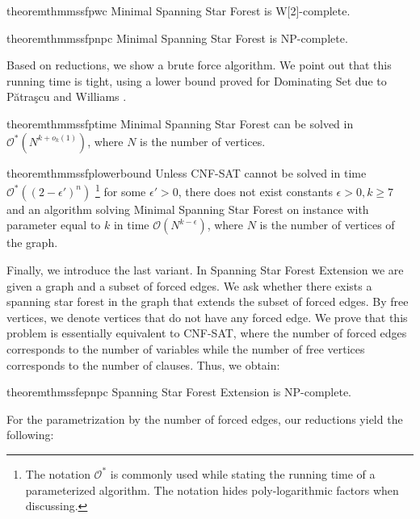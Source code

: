 \documentclass[en]{pracamgr}
\theoremstyle{definition}
\newcommand{\mssfp}{{\sc Minimal Spanning Star Forest}}
\newcommand{\ssfep}{{\sc Spanning Star Forest Extension}}
\newcommand{\domsetp}{{\sc Dominating Set}}
\newcommand{\cnfsat}{{\sc CNF-SAT}}
\begin{document}
\begin{restatable}{theorem}{thmmssfpwc}\label{thm-mssfp-w2c}
	\mssfp{} is \textup{W[2]}-complete.
\end{restatable}

\begin{restatable}{theorem}{thmmssfpnpc}\label{thm-mssfp-npc}
	\mssfp{} is \textup{NP-complete}.
\end{restatable}

\noindent
Based on reductions, we show a brute force algorithm. We point out that this running time is tight, using a lower bound proved for \domsetp{} due to Pătraşcu and Williams \cite{DomSet}. 

\begin{restatable}{theorem}{thmmssfptime}\label{thm-mssfp-time}
	\mssfp{} can be solved in $\mathcal{O}^*(N^{k + o_k(1)})$, where $N$ is the number of vertices.
\end{restatable}

\begin{restatable}{theorem}{thmmssfplowerbound}\label{thm-mssfp-lowerbound}
	Unless \cnfsat{} cannot be solved in time $\mathcal{O}^*((2-\epsilon')^n)$
	\footnote{The notation $\mathcal{O}^*$ is commonly used while stating the running time of a parameterized algorithm. The notation hides poly-logarithmic factors when discussing.}
	 for some $\epsilon' > 0$, there does not exist constants $\epsilon > 0,k\geq 7$ and an algorithm solving \mssfp{} on instance with parameter equal to $k$ in time $\mathcal{O}(N^{k-\epsilon})$, where $N$ is the number of vertices of the graph.
\end{restatable}

Finally, we introduce the last variant. In \ssfep{} we are given a graph and a subset of forced edges. We ask whether there exists a spanning star forest in the graph that extends the subset of forced edges. By free vertices, we denote vertices that do not have any forced edge. We prove that this problem is essentially equivalent to \cnfsat{}, where the number of forced edges corresponds to the number of variables while the number of free vertices corresponds to the number of clauses. Thus, we obtain:

\begin{restatable}{theorem}{thmssfepnpc}\label{thm-ssfep-npc}
	\ssfep{} is \textup{NP}-complete.
\end{restatable}

\noindent
For the parametrization by the number of forced edges, our reductions yield the following:
\end{document}

